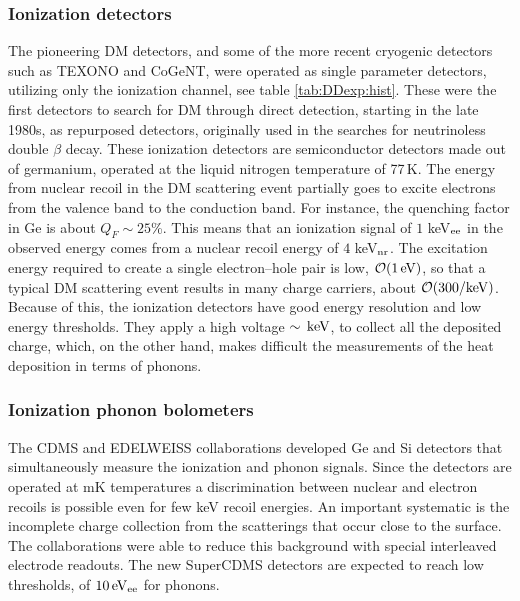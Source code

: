 \subsubsection*{Ionization detectors} 
The pioneering DM detectors, and some of the more recent cryogenic detectors such as TEXONO  and CoGeNT, were operated as single parameter detectors, utilizing only the ionization channel, see table \ref{tab:DDexp:hist}. 
These were the first detectors to search for DM through direct detection, starting in the late 1980s, as repurposed detectors, originally used in the searches for neutrinoless double $\beta$ decay.  These ionization detectors are semiconductor detectors made out of germanium, operated at the liquid nitrogen temperature of 77$\,$K.  
The energy from nuclear recoil in the  DM scattering event partially goes to excite electrons from the valence band to the conduction band. 
For instance, the quenching factor in Ge is about $Q_F\sim 25$\%. 
This means that an ionization signal  of $1$ keV${}_{\rm ee}$ in the observed energy comes from a nuclear recoil energy of $4$ keV${}_{\rm nr}$.  
The excitation energy required to create a single electron--hole pair is low, ${\mathcal O}(1\,{\rm eV})$, so that a typical DM scattering event results in many charge carriers, about ${\mathcal O}(300/{\rm keV})$. 
Because of this, the ionization detectors have good energy resolution and low energy thresholds. 
They apply a high voltage $\sim \,{\rm keV}$, to collect all the deposited charge, which, on the other hand, makes  difficult the measurements of the heat deposition in terms of phonons. 


\subsubsection*{Ionization phonon bolometers} 
The CDMS and EDELWEISS collaborations developed Ge and Si detectors that simultaneously measure  the ionization and phonon signals. 
Since the detectors are operated at mK temperatures a discrimination between nuclear and electron recoils is possible even for few keV recoil energies. An important systematic is the incomplete charge collection from the scatterings that occur close to the surface. The collaborations were able to reduce this background with special interleaved electrode readouts. The new SuperCDMS detectors
are expected to reach low thresholds, of $10\,{\rm eV}_{\rm ee}$ for phonons. 


